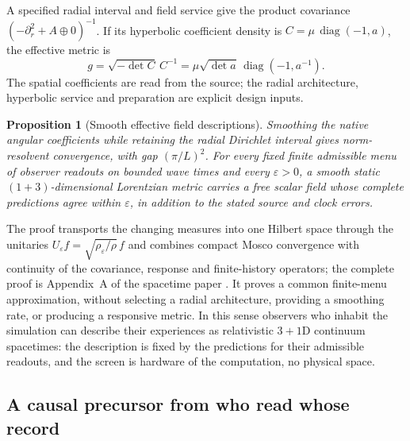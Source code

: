 \documentclass[11pt]{article}
\newtheorem{proposition}[theorem]{Proposition}
\theoremstyle{definition}
\theoremstyle{remark}
\begin{document}
A specified radial interval and field service give the product covariance
$(-\partial_r^2+A\oplus0)^{-1}$. If its hyperbolic coefficient density is
$C=\mu\,\operatorname{diag}(-1,a)$, the effective metric is
\[
 g=\sqrt{-\det C}\,C^{-1}
  =\mu\sqrt{\det a}\,\operatorname{diag}(-1,a^{-1}).
\]
The spatial coefficients are read from the source; the radial architecture,
hyperbolic service and preparation are explicit design inputs.
\begin{proposition}[Smooth effective field descriptions]
\label{prop:effective-lorentzian}
Smoothing the native angular coefficients while retaining the radial
Dirichlet interval gives norm-resolvent convergence, with gap $(\pi/L)^2$.
For every fixed finite admissible menu of observer readouts on bounded wave
times and every $\varepsilon>0$, a smooth static $(1+3)$-dimensional
Lorentzian metric carries a free scalar field whose complete predictions
agree within $\varepsilon$, in addition to the stated source and clock errors.
\end{proposition}
The proof transports the changing measures into one Hilbert space through
the unitaries $U_\varepsilon f=\sqrt{\rho_\varepsilon/\rho}\,f$ and
combines compact Mosco convergence with continuity of the covariance,
response and finite-history operators; the complete proof is Appendix~A of
the spacetime paper \cite{ophEinstein}. It proves a common
finite-menu approximation, without selecting a radial architecture,
providing a smoothing rate, or producing a responsive metric. In this
sense observers who inhabit the simulation can describe their experiences
as relativistic $3{+}1$D continuum spacetimes: the description is fixed by
the predictions for their admissible readouts, and the screen is hardware
of the computation, no physical space.

\subsection{A causal precursor from who read whose record}
\label{sec:spacetime}
\end{document}
